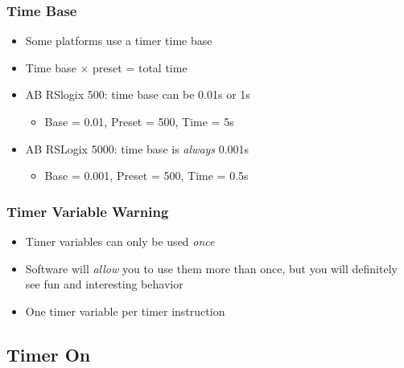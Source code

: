 \begin{frame}
    \frametitle{Time Base}

    \begin{itemize}
        \item Some platforms use a timer time base
        \item Time base $\times$ preset = total time
        \item AB RSlogix 500: time base can be 0.01s or 1s
        \begin{itemize}
            \item Base = 0.01, Preset = 500, Time = 5s
        \end{itemize}
        \item AB RSLogix 5000: time base is \emph{always} 0.001s
        \begin{itemize}
            \item Base = 0.001, Preset = 500, Time = 0.5s
        \end{itemize} 
    \end{itemize}
\end{frame}

\begin{frame}
    \frametitle{Timer Variable Warning}

    \begin{itemize}
        \item Timer variables can only be used \emph{once}
        \item Software will \emph{allow} you to use them more than once, but you will definitely see fun and interesting behavior
        \item One timer variable per timer instruction
    \end{itemize}
\end{frame}

\subsection{Timer On}


